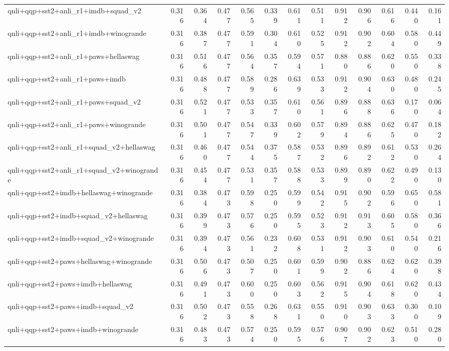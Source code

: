 \begin{table}[t]
\begin{tabular}{lrrrrrrrrrrrr}
    qnli+qqp+sst2+anli\_r1+imdb+squad\_v2 & 0.316 & 0.364 & 0.477 & 0.565 & 0.339 & 0.611 & 0.511 & 0.912 & 0.906 & 0.616 & 0.440 & 0.161 \\
    qnli+qqp+sst2+anli\_r1+imdb+winogrande & 0.316 & 0.387 & 0.477 & 0.591 & 0.304 & 0.610 & 0.525 & 0.912 & 0.902 & 0.604 & 0.580 & 0.449 \\
    qnli+qqp+sst2+anli\_r1+paws+hellaswag & 0.316 & 0.516 & 0.477 & 0.564 & 0.357 & 0.594 & 0.571 & 0.880 & 0.886 & 0.620 & 0.550 & 0.338 \\
    qnli+qqp+sst2+anli\_r1+paws+imdb & 0.316 & 0.488 & 0.477 & 0.589 & 0.286 & 0.639 & 0.533 & 0.912 & 0.904 & 0.630 & 0.480 & 0.245 \\
    qnli+qqp+sst2+anli\_r1+paws+squad\_v2 & 0.316 & 0.521 & 0.477 & 0.533 & 0.357 & 0.610 & 0.561 & 0.896 & 0.888 & 0.636 & 0.170 & 0.064 \\
    qnli+qqp+sst2+anli\_r1+paws+winogrande & 0.316 & 0.501 & 0.477 & 0.547 & 0.339 & 0.602 & 0.579 & 0.894 & 0.886 & 0.625 & 0.470 & 0.182 \\
    qnli+qqp+sst2+anli\_r1+squad\_v2+hellaswag & 0.316 & 0.460 & 0.477 & 0.544 & 0.375 & 0.587 & 0.532 & 0.896 & 0.892 & 0.612 & 0.530 & 0.264 \\
    qnli+qqp+sst2+anli\_r1+squad\_v2+winogrande & 0.316 & 0.454 & 0.477 & 0.531 & 0.357 & 0.588 & 0.533 & 0.899 & 0.890 & 0.622 & 0.490 & 0.130 \\
    qnli+qqp+sst2+imdb+hellaswag+winogrande & 0.316 & 0.384 & 0.473 & 0.598 & 0.250 & 0.599 & 0.542 & 0.915 & 0.902 & 0.596 & 0.650 & 0.581 \\
    qnli+qqp+sst2+imdb+squad\_v2+hellaswag & 0.316 & 0.399 & 0.473 & 0.576 & 0.250 & 0.595 & 0.523 & 0.912 & 0.913 & 0.605 & 0.580 & 0.366 \\
    qnli+qqp+sst2+imdb+squad\_v2+winogrande & 0.316 & 0.394 & 0.473 & 0.561 & 0.232 & 0.608 & 0.531 & 0.912 & 0.903 & 0.610 & 0.540 & 0.216 \\
    qnli+qqp+sst2+paws+hellaswag+winogrande & 0.316 & 0.506 & 0.473 & 0.507 & 0.250 & 0.601 & 0.599 & 0.902 & 0.886 & 0.624 & 0.620 & 0.398 \\
    qnli+qqp+sst2+paws+imdb+hellaswag & 0.316 & 0.491 & 0.473 & 0.600 & 0.250 & 0.603 & 0.562 & 0.915 & 0.904 & 0.618 & 0.620 & 0.434 \\
    qnli+qqp+sst2+paws+imdb+squad\_v2 & 0.316 & 0.502 & 0.473 & 0.558 & 0.268 & 0.631 & 0.550 & 0.910 & 0.903 & 0.633 & 0.300 & 0.109 \\
    qnli+qqp+sst2+paws+imdb+winogrande & 0.316 & 0.483 & 0.473 & 0.574 & 0.250 & 0.595 & 0.576 & 0.907 & 0.902 & 0.623 & 0.510 & 0.280 \\

\end{tabular}
\end{table}
